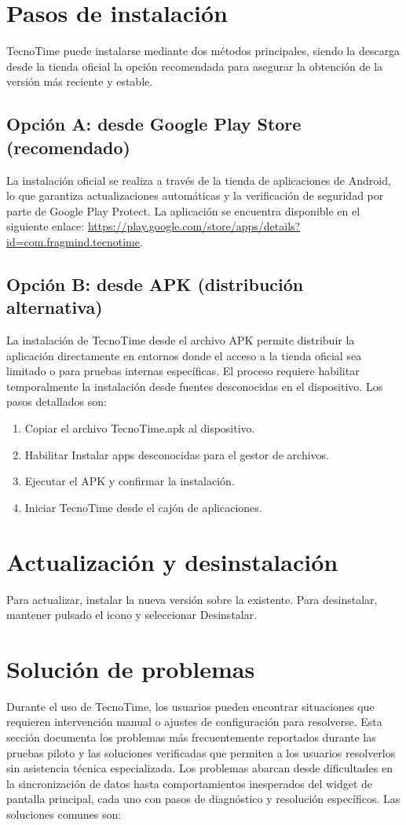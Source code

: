 \section{Pasos de instalación}

TecnoTime puede instalarse mediante dos métodos principales, siendo la descarga desde la tienda oficial la opción recomendada para asegurar la obtención de la versión más reciente y estable.

\subsection{Opción A: desde Google Play Store (recomendado)}
La instalación oficial se realiza a través de la tienda de aplicaciones de Android, lo que garantiza actualizaciones automáticas y la verificación de seguridad por parte de Google Play Protect. La aplicación se encuentra disponible en el siguiente enlace: \url{https://play.google.com/store/apps/details?id=com.fragmind.tecnotime}.

\subsection{Opción B: desde APK (distribución alternativa)}
La instalación de TecnoTime desde el archivo APK permite distribuir la aplicación directamente en entornos donde el acceso a la tienda oficial sea limitado o para pruebas internas específicas. El proceso requiere habilitar temporalmente la instalación desde fuentes desconocidas en el dispositivo. Los pasos detallados son:

\begin{enumerate}
  \item Copiar el archivo TecnoTime.apk al dispositivo.
  \item Habilitar Instalar apps desconocidas para el gestor de archivos.
  \item Ejecutar el APK y confirmar la instalación.
  \item Iniciar TecnoTime desde el cajón de aplicaciones.
\end{enumerate}

\section{Actualización y desinstalación}
Para actualizar, instalar la nueva versión sobre la existente. Para desinstalar, mantener pulsado el icono y seleccionar Desinstalar.

\section{Solución de problemas}
Durante el uso de TecnoTime, los usuarios pueden encontrar situaciones que requieren intervención manual o ajustes de configuración para resolverse. Esta sección documenta los problemas más frecuentemente reportados durante las pruebas piloto y las soluciones verificadas que permiten a los usuarios resolverlos sin asistencia técnica especializada. Los problemas abarcan desde dificultades en la sincronización de datos hasta comportamientos inesperados del widget de pantalla principal, cada uno con pasos de diagnóstico y resolución específicos. Las soluciones comunes son:

